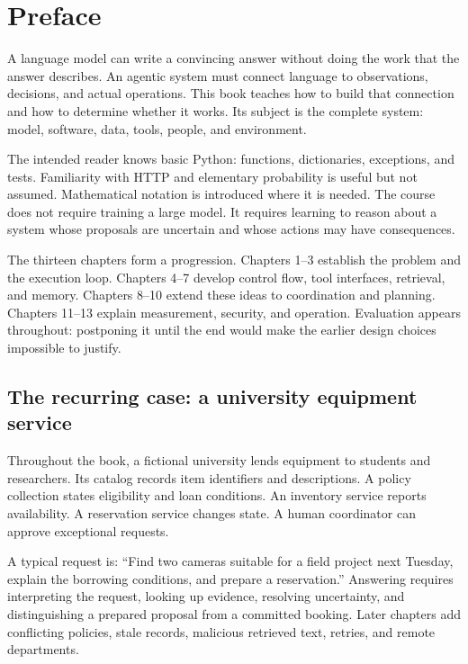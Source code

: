 \chapter*{Preface}
A language model can write a convincing answer without doing the work that the answer describes. An agentic system must connect language to observations, decisions, and actual operations. This book teaches how to build that connection and how to determine whether it works. Its subject is the complete system: model, software, data, tools, people, and environment.

The intended reader knows basic Python: functions, dictionaries, exceptions, and tests. Familiarity with HTTP and elementary probability is useful but not assumed. Mathematical notation is introduced where it is needed. The course does not require training a large model. It requires learning to reason about a system whose proposals are uncertain and whose actions may have consequences.

The thirteen chapters form a progression. Chapters 1–3 establish the problem and the execution loop. Chapters 4–7 develop control flow, tool interfaces, retrieval, and memory. Chapters 8–10 extend these ideas to coordination and planning. Chapters 11–13 explain measurement, security, and operation. Evaluation appears throughout: postponing it until the end would make the earlier design choices impossible to justify.

\section*{The recurring case: a university equipment service}
Throughout the book, a fictional university lends equipment to students and researchers. Its catalog records item identifiers and descriptions. A policy collection states eligibility and loan conditions. An inventory service reports availability. A reservation service changes state. A human coordinator can approve exceptional requests.

A typical request is: “Find two cameras suitable for a field project next Tuesday, explain the borrowing conditions, and prepare a reservation.” Answering requires interpreting the request, looking up evidence, resolving uncertainty, and distinguishing a prepared proposal from a committed booking. Later chapters add conflicting policies, stale records, malicious retrieved text, retries, and remote departments.

